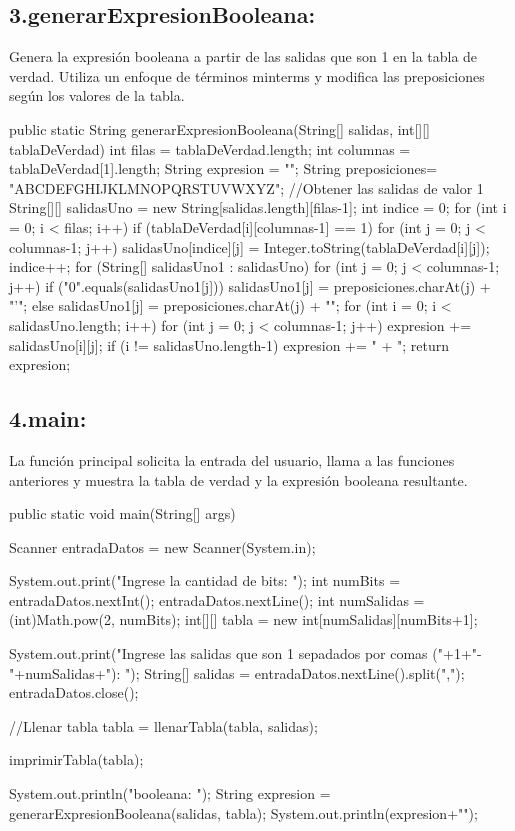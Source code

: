 \documentclass{IEEEcsmag}
\begin{document}
\subsection{3.generarExpresionBooleana:}
Genera la expresión booleana a partir de las salidas que son 1 en la tabla de verdad. Utiliza un enfoque de términos minterms y modifica las preposiciones según los valores de la tabla.
\begin{javaCode}
public static String generarExpresionBooleana(String[] salidas, int[][] tablaDeVerdad){
    int filas = tablaDeVerdad.length;
    int columnas = tablaDeVerdad[1].length;
    String expresion = "";
    String preposiciones= "ABCDEFGHIJKLMNOPQRSTUVWXYZ";
    //Obtener las salidas de valor 1
    String[][] salidasUno = new String[salidas.length][filas-1];
    int indice = 0;
    for (int i = 0; i < filas; i++) {
        if (tablaDeVerdad[i][columnas-1] == 1) {
            for (int j = 0; j < columnas-1; j++) {
                salidasUno[indice][j] = 
                Integer.toString(tablaDeVerdad[i][j]);
            }
            indice++;
        }
    }
    for (String[] salidasUno1 : salidasUno) {
        for (int j = 0; j < columnas-1; j++) {
            if ("0".equals(salidasUno1[j])) {
                salidasUno1[j] = preposiciones.charAt(j) + "'";
            } else {
                salidasUno1[j] = preposiciones.charAt(j) + "";
            }
        }
    }
    for (int i = 0; i < salidasUno.length; i++) {
        for (int j = 0; j < columnas-1; j++) {
            expresion += salidasUno[i][j];
        }
        if (i != salidasUno.length-1) {
            expresion += " + ";
        }
    }
    return expresion;
}
\end{javaCode}

\subsection{4.main:}
La función principal solicita la entrada del usuario, llama a las funciones anteriores y muestra la tabla de verdad y la expresión booleana resultante.
\begin{javaCode}
public static void main(String[] args) {
    Scanner entradaDatos = new Scanner(System.in);

    System.out.print("Ingrese la cantidad de bits: ");
    int numBits = entradaDatos.nextInt();
    entradaDatos.nextLine();
    int numSalidas = (int)Math.pow(2, numBits);
    int[][] tabla = new int[numSalidas][numBits+1];

    System.out.print("Ingrese las salidas que son 1 sepadados por comas ("+1+"-"+numSalidas+"): ");
    String[] salidas = entradaDatos.nextLine().split(",");
    entradaDatos.close();
    
    //Llenar tabla
    tabla = llenarTabla(tabla, salidas);
    
    imprimirTabla(tabla);
    
    System.out.println(" booleana: ");
    String expresion = generarExpresionBooleana(salidas, tabla);
    System.out.println(expresion+"\n");
}
\end{javaCode}
\end{document}
